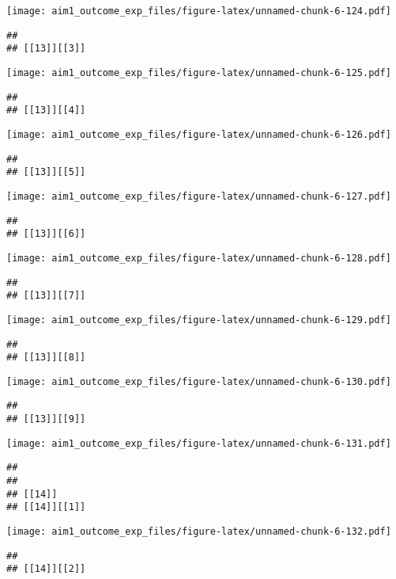 \documentclass[
]{article}
\begin{document}
\texttt{[image: aim1\_outcome\_exp\_files/figure-latex/unnamed-chunk-6-124.pdf]}

\begin{verbatim}
## 
## [[13]][[3]]
\end{verbatim}

\texttt{[image: aim1\_outcome\_exp\_files/figure-latex/unnamed-chunk-6-125.pdf]}

\begin{verbatim}
## 
## [[13]][[4]]
\end{verbatim}

\texttt{[image: aim1\_outcome\_exp\_files/figure-latex/unnamed-chunk-6-126.pdf]}

\begin{verbatim}
## 
## [[13]][[5]]
\end{verbatim}

\texttt{[image: aim1\_outcome\_exp\_files/figure-latex/unnamed-chunk-6-127.pdf]}

\begin{verbatim}
## 
## [[13]][[6]]
\end{verbatim}

\texttt{[image: aim1\_outcome\_exp\_files/figure-latex/unnamed-chunk-6-128.pdf]}

\begin{verbatim}
## 
## [[13]][[7]]
\end{verbatim}

\texttt{[image: aim1\_outcome\_exp\_files/figure-latex/unnamed-chunk-6-129.pdf]}

\begin{verbatim}
## 
## [[13]][[8]]
\end{verbatim}

\texttt{[image: aim1\_outcome\_exp\_files/figure-latex/unnamed-chunk-6-130.pdf]}

\begin{verbatim}
## 
## [[13]][[9]]
\end{verbatim}

\texttt{[image: aim1\_outcome\_exp\_files/figure-latex/unnamed-chunk-6-131.pdf]}

\begin{verbatim}
## 
## 
## [[14]]
## [[14]][[1]]
\end{verbatim}

\texttt{[image: aim1\_outcome\_exp\_files/figure-latex/unnamed-chunk-6-132.pdf]}

\begin{verbatim}
## 
## [[14]][[2]]
\end{verbatim}
\end{document}

